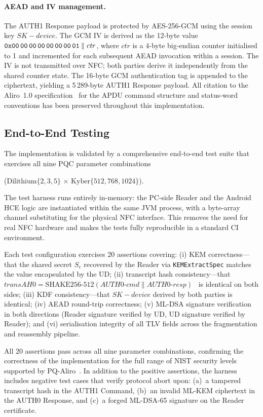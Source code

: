 \documentclass[runningheads]{llncs}
\begin{document}
\paragraph{AEAD and IV management.}
The AUTH1 Response payload is protected by AES-256-GCM using the session key
$\mathit{SK-device}$.
The GCM IV is derived as the 12-byte value
$\texttt{0x00\,00\,00\,00\,00\,00\,00\,01} \mathbin{\|} \mathit{ctr}$,
where $\mathit{ctr}$ is a 4-byte big-endian counter initialised to 1 and
incremented for each subsequent AEAD invocation within a session.
The IV is not transmitted over NFC; both parties derive it independently from
the shared counter state.
The 16-byte GCM authentication tag is appended to the ciphertext, yielding
a 5\,289-byte AUTH1 Response payload.
All citation to the Aliro~1.0 specification~\cite{CSA:Aliro10} for the
APDU command structure and status-word conventions has been preserved
throughout this implementation.

\subsection{End-to-End Testing}
\label{sec:impl:testing}

The implementation is validated by a comprehensive end-to-end test suite
that exercises all nine PQC parameter combinations
{\sloppy($\text{Dilithium}\{2,3,5\}\,\allowbreak\times\,\text{Kyber}\{512,768,1024\}$).\par}
The test harness runs entirely in-memory: the PC-side Reader and the Android
HCE logic are instantiated within the same JVM process, with a byte-array
channel substituting for the physical NFC interface.
This removes the need for real NFC hardware and makes the tests fully
reproducible in a standard CI environment.

{\sloppy
Each test configuration exercises 20 assertions covering: (i) KEM
correctness---that the shared secret $S_e$ recovered by the Reader via
\texttt{KEM\allowbreak Extract\allowbreak Spec} matches the value encapsulated by the UD; (ii)
transcript hash consistency---\allowbreak that $\mathit{transAH0} =
\mathrm{SHAKE256\text{-}512}(\mathit{AUTH0\text{-}cmd} \mathbin{\|} \mathit{AUTH0\text{-}resp})$~\cite{NIST:FIPS202}
is identical on both sides; (iii) KDF consistency---that
$\mathit{SK-device}$ derived by both parties is identical;
(iv) AEAD round-trip correctness; (v) ML-DSA signature verification in both
directions (Reader signature verified by UD, UD signature verified by Reader);
and (vi) serialisation integrity of all TLV fields across the fragmentation
and reassembly pipeline.
\par}
All 20 assertions pass across all nine parameter combinations, confirming
the correctness of the implementation for the full range of NIST security
levels supported by PQ-Aliro~\cite{NIST3PQC:Lima21}.
In addition to the positive assertions, the harness includes negative test cases that verify protocol abort upon: (a)~a tampered transcript hash in the AUTH1 Command, (b)~an invalid ML-KEM ciphertext in the AUTH0 Response, and (c)~a forged ML-DSA-65 signature on the Reader certificate.
\end{document}
